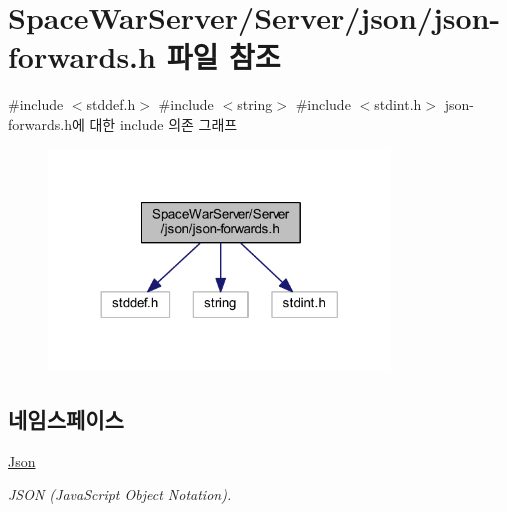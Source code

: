 \hypertarget{json-forwards_8h}{}\section{Space\+War\+Server/\+Server/json/json-\/forwards.h 파일 참조}
\label{json-forwards_8h}
{\ttfamily \#include $<$stddef.\+h$>$}\newline
{\ttfamily \#include $<$string$>$}\newline
{\ttfamily \#include $<$stdint.\+h$>$}\newline
json-\/forwards.h에 대한 include 의존 그래프\nopagebreak
\begin{figure}[H]
\begin{center}
\leavevmode
\includegraphics[width=257pt]{json-forwards_8h__incl}
\end{center}
\end{figure}
\subsection*{네임스페이스}
\begin{DoxyCompactItemize}
\item 
 \hyperlink{namespace_json}{Json}
\begin{DoxyCompactList}\small\item\em J\+S\+ON (Java\+Script Object Notation). \end{DoxyCompactList}\end{DoxyCompactItemize}
